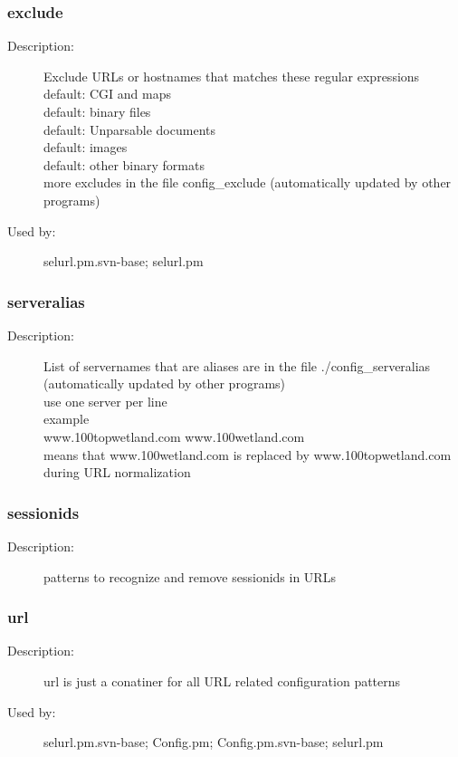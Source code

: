 \subsubsection{exclude}
\label{exclude}
\begin{description}
\item[Description:] Exclude URLs or hostnames that matches these regular expressions \\  default: CGI and maps \\  default: binary files \\  default: Unparsable documents \\  default: images \\  default: other binary formats \\ more excludes in the file config\_exclude (automatically updated by other programs)
\item[Used by:] selurl.pm.svn-base; selurl.pm
\end{description}
\subsubsection{serveralias}
\label{serveralias}
\begin{description}
\item[Description:] List of servernames that are aliases are in the file ./config\_serveralias \\     (automatically updated by other programs) \\ use one server per line \\ example \\ www.100topwetland.com  www.100wetland.com \\   means that www.100wetland.com is replaced by www.100topwetland.com during URL normalization
\end{description}
\subsubsection{sessionids}
\label{sessionids}
\begin{description}
\item[Description:] patterns to recognize and remove sessionids in URLs
\end{description}
\subsubsection{url}
\label{url}
\begin{description}
\item[Description:] url is just a conatiner for all URL related configuration patterns
\item[Used by:] selurl.pm.svn-base; Config.pm; Config.pm.svn-base; selurl.pm
\end{description}
